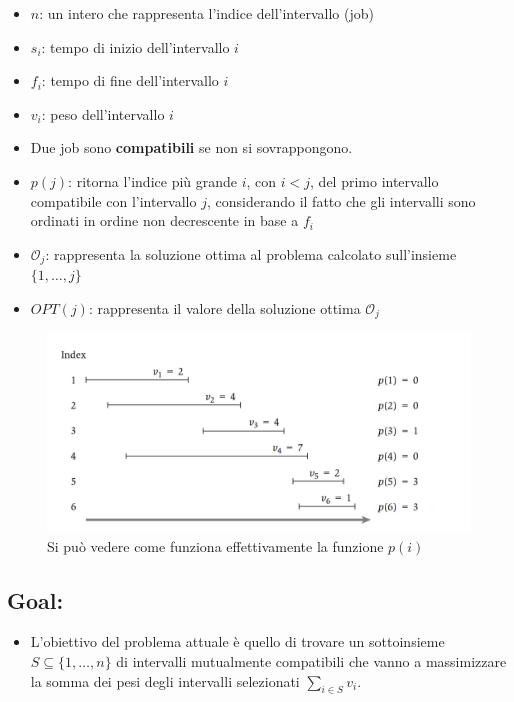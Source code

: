 \begin{itemize}
      \item
            $n$: un intero che rappresenta l'indice dell'intervallo (job)
      \item
            $s_i$: tempo di inizio dell'intervallo $i$
      \item
            $f_i$: tempo di fine dell'intervallo $i$
      \item
            $v_i$: peso dell'intervallo $i$
      \item
            Due job sono \textbf{compatibili} se non si sovrappongono.
      \item
            $p(j)$: ritorna l'indice più grande $i$, con $i < j$, del primo
            intervallo compatibile con l'intervallo $j$, considerando il fatto
            che gli intervalli sono ordinati in ordine non decrescente in base a
            $f_i$
      \item
            $\mathcal{O}_j$: rappresenta la soluzione ottima al problema
            calcolato sull'insieme $\{1, \ldots, j\}$
      \item
            $OPT(j)$: rappresenta il valore della soluzione ottima
            $\mathcal{O}_j$
\end{itemize}

\begin{figure}[H]
      \centering
      \includegraphics[width=15cm, keepaspectratio]{capitoli/programmazione_dinamica/imgs/wis_instance.png}
      \caption{Si può vedere come funziona effettivamente la funzione $p(i)$}
\end{figure}

\subsection{Goal:}

\begin{itemize}
      \item L'obiettivo del problema attuale è quello di trovare un sottoinsieme
            $S \subseteq \{1, \ldots, n\}$ di intervalli mutualmente compatibili
            che vanno a massimizzare la somma dei pesi degli intervalli
            selezionati $\sum_{i \in S} v_i$.
\end{itemize}


